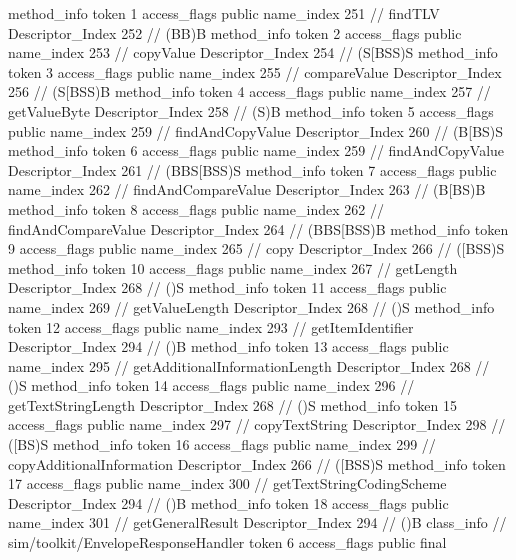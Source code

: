 {{{{{				}
				method_info {
					token	1
					access_flags	public
					name_index	251		// findTLV
					Descriptor_Index	252		// (BB)B
				}
				method_info {
					token	2
					access_flags	public
					name_index	253		// copyValue
					Descriptor_Index	254		// (S[BSS)S
				}
				method_info {
					token	3
					access_flags	public
					name_index	255		// compareValue
					Descriptor_Index	256		// (S[BSS)B
				}
				method_info {
					token	4
					access_flags	public
					name_index	257		// getValueByte
					Descriptor_Index	258		// (S)B
				}
				method_info {
					token	5
					access_flags	public
					name_index	259		// findAndCopyValue
					Descriptor_Index	260		// (B[BS)S
				}
				method_info {
					token	6
					access_flags	public
					name_index	259		// findAndCopyValue
					Descriptor_Index	261		// (BBS[BSS)S
				}
				method_info {
					token	7
					access_flags	public
					name_index	262		// findAndCompareValue
					Descriptor_Index	263		// (B[BS)B
				}
				method_info {
					token	8
					access_flags	public
					name_index	262		// findAndCompareValue
					Descriptor_Index	264		// (BBS[BSS)B
				}
				method_info {
					token	9
					access_flags	public
					name_index	265		// copy
					Descriptor_Index	266		// ([BSS)S
				}
				method_info {
					token	10
					access_flags	public
					name_index	267		// getLength
					Descriptor_Index	268		// ()S
				}
				method_info {
					token	11
					access_flags	public
					name_index	269		// getValueLength
					Descriptor_Index	268		// ()S
				}
				method_info {
					token	12
					access_flags	public
					name_index	293		// getItemIdentifier
					Descriptor_Index	294		// ()B
				}
				method_info {
					token	13
					access_flags	public
					name_index	295		// getAdditionalInformationLength
					Descriptor_Index	268		// ()S
				}
				method_info {
					token	14
					access_flags	public
					name_index	296		// getTextStringLength
					Descriptor_Index	268		// ()S
				}
				method_info {
					token	15
					access_flags	public
					name_index	297		// copyTextString
					Descriptor_Index	298		// ([BS)S
				}
				method_info {
					token	16
					access_flags	public
					name_index	299		// copyAdditionalInformation
					Descriptor_Index	266		// ([BSS)S
				}
				method_info {
					token	17
					access_flags	public
					name_index	300		// getTextStringCodingScheme
					Descriptor_Index	294		// ()B
				}
				method_info {
					token	18
					access_flags	public
					name_index	301		// getGeneralResult
					Descriptor_Index	294		// ()B
				}
			}
		}
		class_info {		// sim/toolkit/EnvelopeResponseHandler
			token	6
			access_flags	public final
}}}
